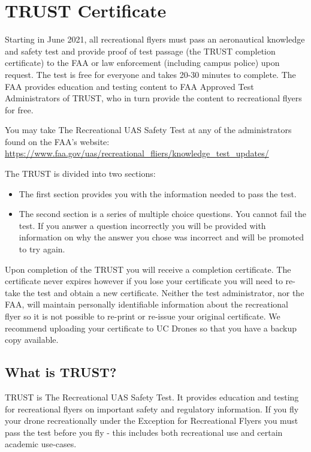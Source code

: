 \documentclass[
  12pt,
]{book}
\providecommand{\tightlist}{%
  \setlength{\itemsep}{0pt}\setlength{\parskip}{0pt}}
\begin{document}
\hypertarget{TRUST}{%
\section{TRUST Certificate}\label{TRUST}}

Starting in June 2021, all recreational flyers must pass an aeronautical knowledge and safety test and provide proof of test passage (the TRUST completion certificate) to the FAA or law enforcement (including campus police) upon request. The test is free for everyone and takes 20-30 minutes to complete. The FAA provides education and testing content to FAA Approved Test Administrators of TRUST, who in turn provide the content to recreational flyers for free.

You may take The Recreational UAS Safety Test at any of the administrators found on the FAA's website:
\url{https://www.faa.gov/uas/recreational_fliers/knowledge_test_updates/}

The TRUST is divided into two sections:

\begin{itemize}
\tightlist
\item
  The first section provides you with the information needed to pass the test.
\item
  The second section is a series of multiple choice questions. You cannot fail the test. If you answer a question incorrectly you will be provided with information on why the answer you chose was incorrect and will be promoted to try again.
\end{itemize}

Upon completion of the TRUST you will receive a completion certificate. The certificate never expires however if you lose your certificate you will need to re-take the test and obtain a new certificate. Neither the test administrator, nor the FAA, will maintain personally identifiable information about the recreational flyer so it is not possible to re-print or re-issue your original certificate. We recommend uploading your certificate to UC Drones so that you have a backup copy available.

\hypertarget{what-is-trust}{%
\subsection{What is TRUST?}\label{what-is-trust}}

TRUST is The Recreational UAS Safety Test. It provides education and testing for recreational flyers on important safety and regulatory information. If you fly your drone recreationally under the Exception for Recreational Flyers you must pass the test before you fly - this includes both recreational use and certain academic use-cases.
\end{document}
